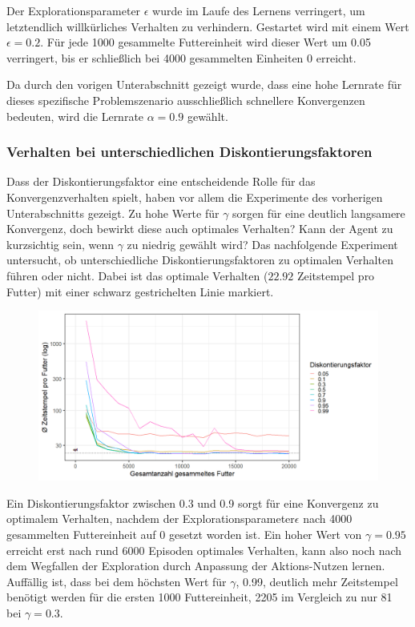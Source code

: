 \par 
Der Explorationsparameter $\epsilon$ wurde im Laufe des Lernens verringert, um letztendlich willkürliches Verhalten zu verhindern. Gestartet wird mit einem Wert $\epsilon = 0.2$. Für jede 1000 gesammelte Futtereinheit wird dieser Wert um 0.05 verringert, bis er schließlich bei 4000 gesammelten Einheiten 0 erreicht. 
\par 
Da durch den vorigen Unterabschnitt gezeigt wurde, dass eine hohe Lernrate für dieses spezifische Problemszenario ausschließlich schnellere Konvergenzen bedeuten, wird die Lernrate $\alpha = 0.9$ gewählt.

\subsubsection*{Verhalten bei unterschiedlichen Diskontierungsfaktoren}
Dass der Diskontierungsfaktor eine entscheidende Rolle für das Konvergenzverhalten spielt, haben vor allem die Experimente des vorherigen Unterabschnitts gezeigt. Zu hohe Werte für $\gamma$ sorgen für eine deutlich langsamere Konvergenz, doch bewirkt diese auch optimales Verhalten? Kann der Agent zu \glqq kurzsichtig\grqq{} sein, wenn $\gamma$ zu niedrig gewählt wird? 
Das nachfolgende Experiment untersucht, ob unterschiedliche Diskontierungsfaktoren zu optimalen Verhalten führen oder nicht. Dabei ist das optimale Verhalten ($22.92$ Zeitstempel pro Futter) mit einer schwarz gestrichelten Linie markiert.
\begin{figure}[H]
    \centering
    \includegraphics[width=\textwidth]{images/optDisc}
    \label{fig:optDisc}
\end{figure}
Ein Diskontierungsfaktor zwischen 0.3 und 0.9 sorgt für eine Konvergenz zu optimalem Verhalten, nachdem der Explorationsparameter$\epsilon$ nach 4000 gesammelten Futtereinheit auf 0 gesetzt worden ist. Ein hoher Wert von $\gamma = 0.95$ erreicht erst nach rund 6000 Episoden optimales Verhalten, kann also noch nach dem Wegfallen der Exploration durch Anpassung der Aktions-Nutzen lernen. Auffällig ist, dass bei dem höchsten Wert für $\gamma$, 0.99, deutlich mehr Zeitstempel benötigt werden für die ersten 1000 Futtereinheit, 2205 im Vergleich zu nur 81 bei $\gamma = 0.3$. 
